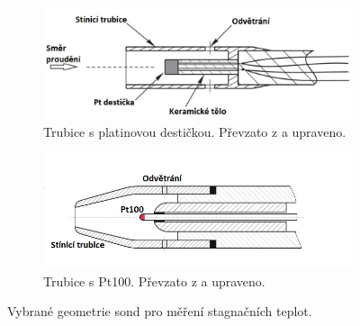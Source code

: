 \begin{figure}[ht!]
                \begin{subfigure}{.45\textwidth}
                    \includegraphics[width=\textwidth]{100_MERENI_TEPLOT/Bonham2013-ptfilm.jpg}
                    \caption{Trubice s platinovou destičkou.  Převzato z \cite{Bonham2013} a upraveno.}
                \end{subfigure} \hspace{.05\textwidth}
                \begin{subfigure}{.45\textwidth}
                    \includegraphics[width=\textwidth]{100_MERENI_TEPLOT/Sedlak2018-Pt100.jpg}
                    \caption{Trubice s Pt100. Převzato z \cite{Sedlak2018} a upraveno.}
                \end{subfigure}

                \caption{Vybrané geometrie sond pro měření stagnačních teplot.}
            \end{figure}

    